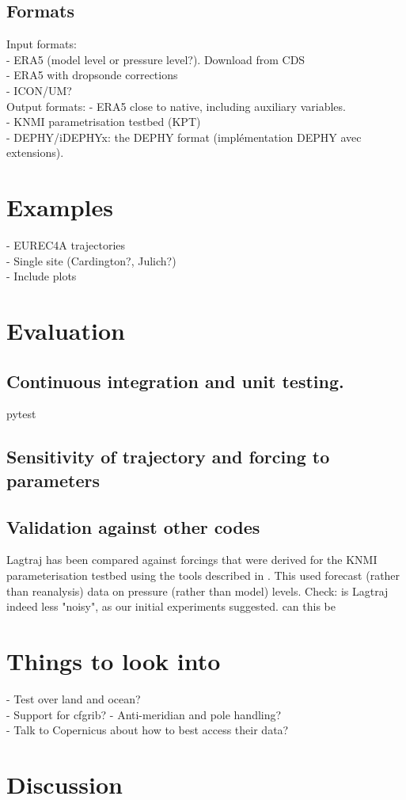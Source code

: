 \documentclass[a4paper,11pt]{article}
\begin{document}
\subsection{Formats}

Input formats: \\
- ERA5 (model level or pressure level?). Download from CDS \citep{raoult2017} \\
- ERA5 with dropsonde corrections \citep{bony2019} \\
- ICON/UM? \\

Output formats:
- ERA5 close to native, including auxiliary variables. \\
- KNMI parametrisation testbed (KPT) \\
- DEPHY/iDEPHYx: the DEPHY format (implémentation DEPHY avec extensions). \\

\section{Examples}\label{sec:examples}

- EUREC4A trajectories \cite{bony2017} \\
- Single site (Cardington?, Julich?) \\
- Include plots

\section{Evaluation}\label{sec:evaluation}

\subsection{Continuous integration and unit testing.}

pytest \citep{okken2017}

\subsection{Sensitivity of trajectory and forcing to parameters}



\subsection{Validation against other codes}

Lagtraj has been compared against forcings that were derived for the KNMI parameterisation testbed using the tools described in .
This used forecast (rather than reanalysis) data on pressure (rather than model) levels.
Check: is Lagtraj indeed less "noisy", as our initial experiments suggested. can this be

\section*{Things to look into}

- Test over land and ocean? \\
- Support for cfgrib?
- Anti-meridian and pole handling? \\
- Talk to Copernicus about how to best access their data? \\

\section{Discussion}



\end{document}

